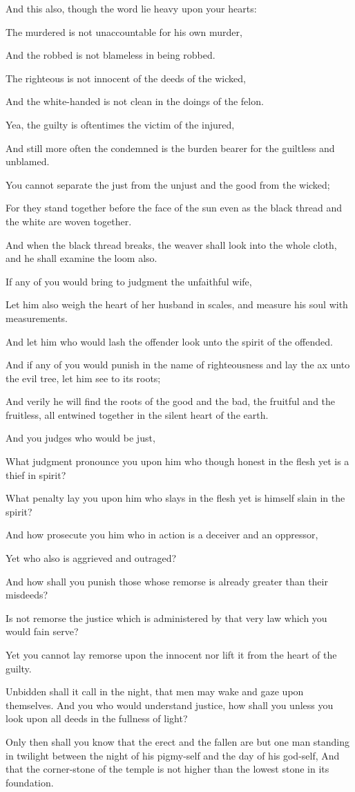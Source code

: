 And this also, though the word lie heavy
upon your hearts:

The murdered is not unaccountable for
his own murder,

And the robbed is not blameless in being
robbed.

The righteous is not innocent of the
deeds of the wicked,

And the white-handed is not clean in the
doings of the felon.

Yea, the guilty is oftentimes the victim
of the injured,

And still more often the condemned is
the burden bearer for the guiltless
and unblamed.

You cannot separate the just from the
unjust and the good from the wicked;

For they stand together before the face
of the sun even as the black thread and
the white are woven together.

And when the black thread breaks, the
weaver shall look into the whole cloth,
and he shall examine the loom also.



If any of you would bring to judgment
the unfaithful wife,

Let him also weigh the heart of her
husband in scales, and measure his soul
with measurements.

And let him who would lash the offender
look unto the spirit of the offended.

And if any of you would punish in the
name of righteousness and lay the ax
unto the evil tree, let him see to its
roots;

And verily he will find the roots of the
good and the bad, the fruitful and the
fruitless, all entwined together in
the silent heart of the earth.

And you judges who would be just,

What judgment pronounce you upon him
who though honest in the flesh yet is a
thief in spirit?

What penalty lay you upon him who slays
in the flesh yet is himself slain in the
spirit?

And how prosecute you him who in action
is a deceiver and an oppressor,

Yet who also is aggrieved and outraged?



And how shall you punish those whose
remorse is already greater than their
misdeeds?

Is not remorse the justice which is
administered by that very law which you
would fain serve?

Yet you cannot lay remorse upon the
innocent nor lift it from the heart of
the guilty.

Unbidden shall it call in the night,
that men may wake and gaze upon
themselves. And you who would
understand justice, how shall you unless
you look upon all deeds in the fullness
of light?

Only then shall you know that the erect
and the fallen are but one man standing
in twilight between the night of his
pigmy-self and the day of his god-self,
And that the corner-stone of the temple
is not higher than the lowest stone in
its foundation.
